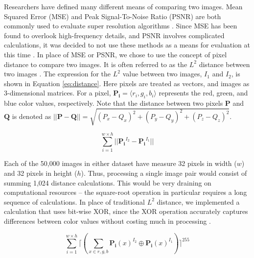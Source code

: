 \documentclass[letterpaper]{article} %
\begin{document}
Researchers have defined many different means of comparing two images.
Mean Squared Error (MSE) and Peak Signal-To-Noise Ratio (PSNR)
are both commonly used to evaluate super resolution algorithms
\cite{super_resolution}.
Since MSE has been found to overlook high-frequency details,
and PSNR involves complicated calculations,
it was decided to not use these methods as a means for evaluation
at this time
\cite{srgan}.
In place of MSE or PSNR, we chose to use the concept of pixel distance
to compare two images.
It is often referred to as the $L^2$ distance between two images \cite{graphics}.
The expression for the $L^2$ value between two images, $I_1$ and $I_2$, is
shown in Equation \ref{eq:distance}.
Here pixels are treated as vectors, and images as
3-dimensional matrices.
For a pixel,
$\mathbf{P_i} = \langle r_i,g_i,b_i \rangle$ represents
the red, green, and blue color values,
respectively.
Note that the distance between
two pixels $\mathbf{P}$ and $\mathbf{Q}$ is denoted as
$||\mathbf{P} - \mathbf{Q}|| =
\sqrt{(P_x - Q_x)^2 + (P_y - Q_y)^2 + (P_z - Q_z)^2}$.

\begin{equation}
\label{eq:distance}
\sum_{i=1}^{w \times h}||\mathbf{P_i}^{I_2} - \mathbf{P_i}^{I_1}||
\end{equation}

Each of the 50,000 images in either dataset have measure
32 pixels in width ($w$) and 32 pixels in height ($h$).
Thus, processing a single image pair would consist of summing 1,024
distance calculations.
This would be very draining on computational resources --
the square-root operation in particular requires a long sequence of calculations.
In place of traditional $L^2$ distance, we implemented a calculation
that uses bit-wise XOR,
since the XOR operation accurately captures differences between color
values without costing much in processing
\cite{image_analysis}.

\begin{equation}
\label{eq:xor}
\sum_{i=1}^{w \times h}\lceil(\sum_{x \in r,g,b}\mathbf{P_i}(x)^{I_2} \oplus \mathbf{P_i}(x)^{I_1})\rceil^{255}
\end{equation}
\end{document}
